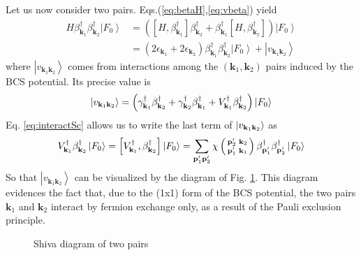 \documentclass[aps,prb,superscriptaddress,twocolumn]{revtex4}
\newcommand{\vk}{\ensuremath{\mathbf{k}}}
\newcommand{\vp}{\ensuremath{\mathbf{p}}}
\begin{document}
Let us now consider two pairs. Eqs.(\ref{eq:betaH},\ref{eq:vbeta}) yield 
\begin{equation}  \label{eq:SchTwo}
\begin{split}
H\beta^{\dagger}_{\mathbf{k} _1}\beta^{\dagger}_{\mathbf{k}
_2}\left|F_0\right>   &=\left(\left[H,\beta^{\dagger}_{\mathbf{k} _1}\right]
\beta^{\dagger}_{\mathbf{k} _2}+\beta^{\dagger}_{\mathbf{k} _1}\left[%
H,\beta^{\dagger}_{\mathbf{k} _2}\right]  \right) \left|F_0\right>   \\
&=\left(2\epsilon_{\mathbf{k} _1}+2\epsilon_{\mathbf{k} _2}\right)
\beta^{\dagger}_{\mathbf{k} _1}\beta^{\dagger}_{\mathbf{k}
_2}\left|F_0\right>  +\left|v_{\mathbf{k} _1\mathbf{k} _2}\right> 
\end{split}%
\end{equation}
where $\left|v_{\mathbf{k} _1\mathbf{k} _2}\right> $ comes from interactions
among the $\left(\mathbf{k} _1,\mathbf{k} _2\right) $ pairs induced by the
BCS potential. Its precise value is 
\begin{equation}
\left|v_{\mathbf{k} _1\mathbf{k} _2}\right> =\left(\gamma^{\dagger}_{\mathbf{%
k} _1}\beta^{\dagger}_{\mathbf{k} _2}+\gamma^{\dagger}_{\mathbf{k}
_2}\beta^{\dagger}_{\mathbf{k} _1}+V^{\dagger}_{\mathbf{k}
_1}\beta^{\dagger}_{\mathbf{k} _2}\right) \left|F_0\right>  
\end{equation}
Eq. \eqref{eq:interactSc} allows us to write the last term of $\left|v_{%
\mathbf{k} _1\mathbf{k} _2}\right> $ as 
\begin{equation}
V^{\dagger}_{\mathbf{k} _1}\beta^{\dagger}_{\mathbf{k} _2}\left|F_0\right>  =%
\left[V^{\dagger}_{\mathbf{k} _1},\beta^{\dagger}_{\mathbf{k} _2}\right] 
\left|F_0\right>  = \sum_{\mathbf{p} ^{\prime}_1\mathbf{p}
^{\prime}_2}\chi\left(\begin{smallmatrix}\vp'_2&\vk_2\\\vp'_1&\vk_1%
\end{smallmatrix}\right)  \beta^{\dagger}_{\mathbf{p} ^{\prime}_1}\beta^{%
\dagger}_{\mathbf{p} ^{\prime}_2}\left|F_0\right>  
\end{equation}
So that $\left|v_{\mathbf{k} _1\mathbf{k} _2}\right> $ can be visualized by
the diagram of Fig. \ref{fig:twoP}. This diagram evidences the fact that,
due to the (1x1) form of the BCS potential, the two pairs $\mathbf{k} _1$
and $\mathbf{k} _2$ interact by fermion exchange only, as a result of the
Pauli exclusion principle.

\begin{figure}[htb]
\caption{Shiva diagram of two pairs }
\label{fig:twoP}
\end{figure}
\end{document}
